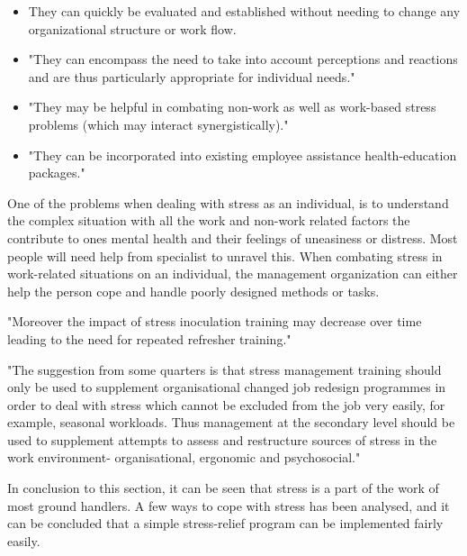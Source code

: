 \begin{itemize}
\item They can quickly be evaluated and established without needing to change any organizational structure or work flow.
\item "They can encompass the need to take into account perceptions and reactions and are thus particularly appropriate for individual needs."
\item "They may be helpful in combating non-work as well as work-based stress problems (which may interact synergistically)."
\item "They can be incorporated into existing employee assistance health-education packages."
\end{itemize}

One of the problems when dealing with stress as an individual, is to understand the complex situation with all the work and non-work related factors the contribute to ones mental health and their feelings of uneasiness or distress. Most people will need help from specialist to unravel this.
When combating stress in work-related situations on an individual, the management organization can either help the person cope and handle poorly designed methods or tasks.

"Moreover the impact of stress inoculation training may decrease over time leading to the need for repeated refresher training."

"The suggestion from some quarters is that stress management training should only be used to supplement organisational changed job redesign programmes in order to deal with stress which cannot be excluded from the job very easily, for example, seasonal workloads. Thus management at the secondary level should be used to supplement attempts to assess and restructure sources of stress in the work environment- organisational, ergonomic and psychosocial."

In conclusion to this section, it can be seen that stress is a part of the work of most ground handlers. A few ways to cope with stress has been analysed, and it can be concluded that a simple stress-relief program can be implemented fairly easily.